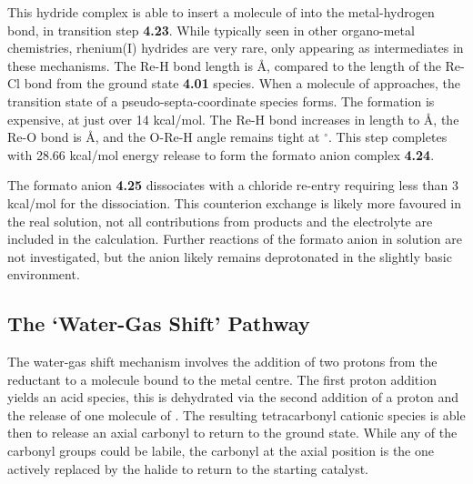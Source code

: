 This hydride complex is able to insert a molecule of  into the metal-hydrogen bond, in transition step \textbf{4.23}. While typically seen in other organo-metal chemistries, rhenium(I) hydrides are very rare, only appearing as intermediates in these mechanisms. The Re-H bond length is  \r{A}, compared to the length of the Re-Cl bond from the ground state \textbf{4.01} species. When a molecule of  approaches, the transition state of a pseudo-septa-coordinate species forms. The formation is expensive, at just over 14 kcal/mol. The Re-H bond increases in length to \r{A}, the Re-O bond is \r{A}, and the O-Re-H angle remains tight at $^\circ$. This step completes with 28.66 kcal/mol energy release to form the formato anion complex \textbf{4.24}. 

The formato anion \textbf{4.25} dissociates with a chloride re-entry requiring less than 3 kcal/mol for the dissociation. This counterion exchange is likely more favoured in the real solution, not all contributions from products and the electrolyte are included in the calculation. Further reactions of the formato anion in solution are not investigated, but the anion likely remains deprotonated in the slightly basic environment. 

\FloatBarrier

\subsection{The `Water-Gas Shift' Pathway}\label{ss.watergas}
The water-gas shift mechanism involves the addition of two protons from the reductant to a  molecule bound to the metal centre. The first proton addition yields an acid species, this is dehydrated via the second addition of a proton and the release of one molecule of . The resulting tetracarbonyl cationic species is able then to release an axial carbonyl to return to the ground state. While any of the carbonyl groups could be labile, the carbonyl at the axial position is the one actively replaced by the halide to return to the starting catalyst\autocite{shaver1992}. 

